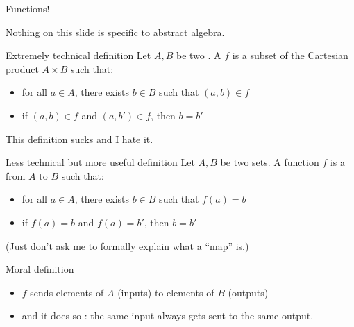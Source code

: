 \documentclass[8pt, handout]{beamer}
\begin{document}
\begin{frame}{Functions!}

  Nothing on this slide is specific to abstract algebra. \pause
  
  \begin{block}{Extremely technical definition}
    Let $A, B$ be two . \pause A  $f$ is a subset of the Cartesian product $A \times B$ such that: \pause
    \begin{itemize}
      \item for all $a\in A$, there exists $b\in B$ such that $(a, b) \in f$
      \pause \hfill \emph{} \pause
      \item if $(a, b) \in f$ and $(a, b') \in f$, then $b = b'$ \hfill \emph{}
    \end{itemize}
  \end{block} \pause

  This definition sucks and I hate it. \pause

  \begin{block}{Less technical but more useful definition}
    Let $A, B$ be two sets. A function $f$ is a  from $A$ to $B$ such that: \pause
    \begin{itemize}
      \item for all $a\in A$, there exists $b\in B$ such that $f(a) = b$
      \pause \hfill \emph{} \pause
      \item if $f(a) = b$ and $f(a) = b'$, then $b = b'$ \hfill \emph{}
    \end{itemize}
  \end{block} \pause

  (Just don't ask me to formally explain what a ``map'' is.) \pause

  \begin{exampleblock}{Moral definition}
    \begin{itemize}
      \item $f$ sends elements of $A$ (inputs) to elements of $B$ (outputs)
      \pause \hfill \emph{} \pause
      \item and it does so : the same input always gets sent to the same output. \pause \hfill \emph{} \pause
    \end{itemize} 
  \end{exampleblock}
  
\end{frame}
\end{document}
